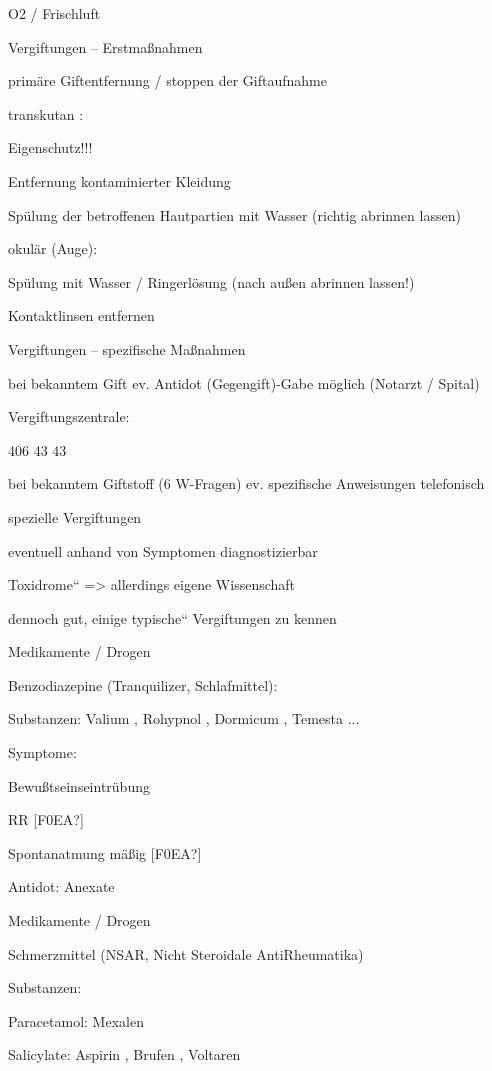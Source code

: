 \documentclass{article}
\begin{document}
O2  / Frischluft

Vergiftungen -- Erstma{\ss}nahmen

prim\"are Giftentfernung / stoppen der Giftaufnahme

transkutan :

Eigenschutz!!!

Entfernung kontaminierter Kleidung

Sp\"ulung der betroffenen Hautpartien mit Wasser  (richtig abrinnen
lassen)

okul\"ar  (Auge):

Sp\"ulung mit Wasser / Ringerl\"osung (nach au{\ss}en abrinnen lassen!)

Kontaktlinsen entfernen

Vergiftungen -- spezifische  Ma{\ss}nahmen

bei bekanntem Gift ev. Antidot  (Gegengift)-Gabe m\"oglich (Notarzt / 
Spital)

Vergiftungszentrale:

406 43 43

bei bekanntem Giftstoff (6 W-Fragen) ev. spezifische Anweisungen
telefonisch

spezielle Vergiftungen

eventuell anhand von Symptomen  diagnostizierbar

{\quotedblbase}Toxidrome{\textquotedblleft} ={\textgreater} allerdings
eigene  Wissenschaft

dennoch gut, einige {\quotedblbase}typische{\textquotedblleft} 
Vergiftungen zu kennen

Medikamente / Drogen

Benzodiazepine  (Tranquilizer,  Schlafmittel):

Substanzen: Valium{\textregistered} , Rohypnol{\textregistered} ,
Dormicum{\textregistered} ,  Temesta{\textregistered}  ...

Symptome:

Bewu{\ss}tseinseintr\"ubung

RR [F0EA?]

Spontanatmung m\"a{\ss}ig [F0EA?]

Antidot: Anexate{\textregistered} 

Medikamente / Drogen

Schmerzmittel (NSAR, Nicht Steroidale AntiRheumatika)

Substanzen: 

Paracetamol: Mexalen{\textregistered}

Salicylate: Aspirin{\textregistered} , Brufen{\textregistered} ,
Voltaren{\textregistered}
\end{document}
